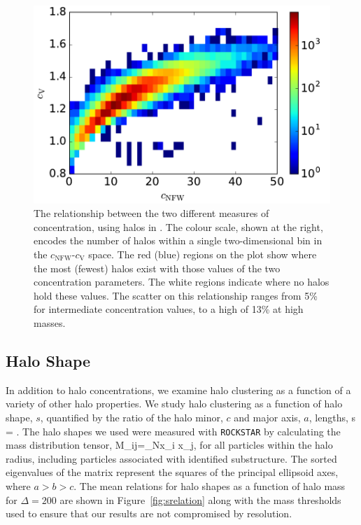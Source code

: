 \documentclass[usenatbib,fleqn]{mnras}
\begin{document}
\begin{figure}
\centering
\includegraphics[width=\columnwidth]{cvvscnfw_relation.pdf}
\caption{
The relationship between the two different measures of concentration, 
using halos in \simB. The colour scale, shown at the right, encodes the number of halos 
within a single two-dimensional bin in the $c_{\mathrm{NFW}}$-$c_{\mathrm{V}}$ space. 
The red (blue) regions on the plot show where the most (fewest) halos exist with those values of the two
concentration parameters. The white regions indicate where no halos hold these values. The scatter on this relationship ranges from 5\% for intermediate concentration values, to a high of 13\% at high masses.
}
\label{fig:concentrations}
\end{figure}


\subsection{Halo Shape}

In addition to halo concentrations, we examine halo clustering as a function of a variety of other 
halo properties. We study halo clustering as a function of halo shape, $s$, 
quantified by the ratio of the halo minor, $c$ and major axis, $a$, lengths, 
%
\beq
s = .
\eeq
%
The halo shapes we used were measured with {\tt ROCKSTAR} by calculating the mass distribution tensor,
\beq
M_{ij}=\sum\limits_{N}x_i x_j,
\eeq
for
all particles within the halo radius, including particles associated with identified substructure. The sorted eigenvalues of the matrix represent
the squares of the principal ellipsoid axes, where $a > b > c$. The mean relations for halo shapes as a function of halo mass for $\Delta=200$ are shown in Figure~\ref{fig:srelation} along with the mass 
thresholds used to ensure that our results are not compromised by 
resolution.
\end{document}
